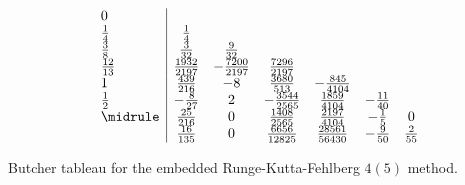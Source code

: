 \begin{table}
  \begin{equation*}
    \begin{array}{l | c c c c c c}
      0      &           &            &             &             &        &\\
      \frac{1}{4}    & \frac{1}{4}       &            &             &             &        &\\
      \frac{3}{8}    & \frac{3}{32}      & \frac{9}{32}       &             &             &        &\\
      \frac{12}{13}  & \frac{1932}{2197} & -\frac{7200}{2197} & \frac{7296}{2197}   &             &        &\\
      1      & \frac{439}{216}   & -8         & \frac{3680}{513}    & -\frac{845}{4104}   &        &\\
      \frac{1}{2}    & -\frac{8}{27}     & 2          & -\frac{3544}{2565}  & \frac{1859}{4104}   & -\frac{11}{40} &\\\midrule
      & \frac{25}{216}    & 0          & \frac{1408}{2565}   & \frac{2197}{4104}   & -\frac{1}{5}   & 0      \\
      & \frac{16}{135}    & 0          & \frac{6656}{12825}  & \frac{28561}{56430} & -\frac{9}{50}  & \frac{2}{55}
    \end{array}
  \end{equation*}
  \caption{Butcher tableau for the embedded Runge-Kutta-Fehlberg $4(5)$ method.\label{tab:rkf45}                                                             }
\end{table}



